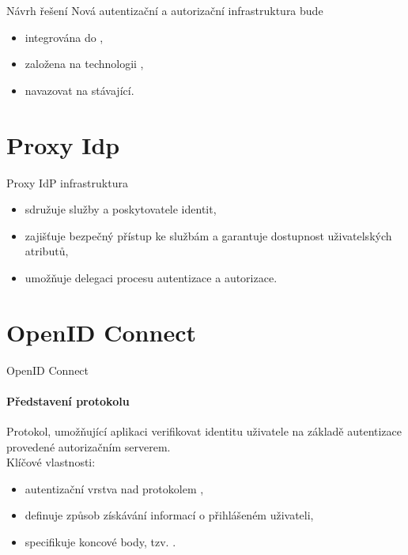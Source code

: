 \documentclass[
]{beamer}
\begin{document}
\begin{frame}{Návrh řešení}
Nová autentizační a autorizační infrastruktura bude
\begin{itemize}
  \item integrována do ,
  \item založena na technologii , 
  \item navazovat na stávající.
\end{itemize}
\end{frame}

\section[Proxy Idp]{Proxy Idp}
\begin{frame}{Proxy IdP infrastruktura}
\begin{itemize}
    \item sdružuje služby a poskytovatele identit,
    \item zajišťuje bezpečný přístup ke službám  a garantuje dostupnost uživatelských atributů,
    \item umožňuje delegaci procesu autentizace a autorizace.

\end{itemize}
\end{frame}

\section[OpenID Connect]{OpenID Connect}

\begin{frame}{OpenID Connect}
\framesubtitle{Představení protokolu}
Protokol, umožňující aplikaci verifikovat identitu uživatele na základě autentizace provedené autorizačním serverem.
\\
\medskip
Klíčové vlastnosti:
\begin{itemize}
  \item autentizační vrstva nad protokolem ,
  \item definuje způsob získávání informací o přihlášeném uživateli,
  \item specifikuje koncové body, tzv. .
\end{itemize}
\end{frame}
\end{document}
